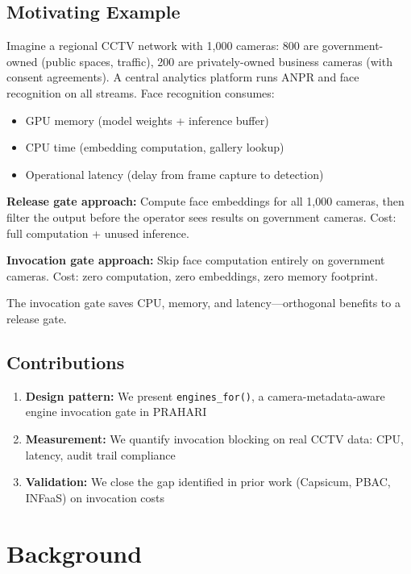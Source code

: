 \documentclass[sigplan,review]{acmart}
\begin{document}
\subsection{Motivating Example}

Imagine a regional CCTV network with 1,000 cameras: 800 are government-owned (public spaces, traffic),
200 are privately-owned business cameras (with consent agreements). A central analytics platform runs
ANPR and face recognition on all streams. Face recognition consumes:
\begin{itemize}
  \item GPU memory (model weights + inference buffer)
  \item CPU time (embedding computation, gallery lookup)
  \item Operational latency (delay from frame capture to detection)
\end{itemize}

\textbf{Release gate approach:} Compute face embeddings for all 1,000 cameras, then filter the output
before the operator sees results on government cameras. Cost: full computation + unused inference.

\textbf{Invocation gate approach:} Skip face computation entirely on government cameras. Cost: zero
computation, zero embeddings, zero memory footprint.

The invocation gate saves CPU, memory, and latency—orthogonal benefits to a release gate.

\subsection{Contributions}

\begin{enumerate}
  \item \textbf{Design pattern:} We present \texttt{engines\_for()}, a camera-metadata-aware engine invocation gate in PRAHARI
  \item \textbf{Measurement:} We quantify invocation blocking on real CCTV data: CPU, latency, audit trail compliance
  \item \textbf{Validation:} We close the gap identified in prior work (Capsicum, PBAC, INFaaS) on invocation costs
\end{enumerate}

\section{Background}
\end{document}
